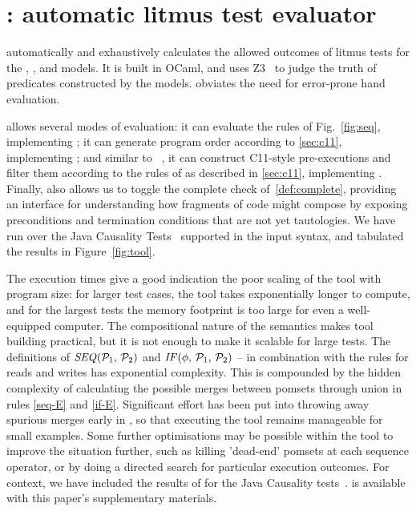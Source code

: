 \section{\PwTerTITLE: automatic litmus test evaluator}
\label{sec:tool}

\PwTer{} automatically and exhaustively calculates the allowed outcomes of litmus tests for the \PwT, \PwTpo, and \PwTc{} models. It is built in OCaml, and uses Z3~\cite{Z3Solver} to judge the truth of predicates constructed by the models. \PwTer{} obviates the need for error-prone hand evaluation.

\PwTer{} allows several modes of evaluation: it can evaluate the rules of Fig.~\ref{fig:seq}, implementing \PwT; it can generate program order according to \textsection\ref{sec:c11}, implementing \PwTpo; and similar to \MRD~\cite{DBLP:conf/esop/PaviottiCPWOB20}, it can construct C11-style pre-executions and filter them according to the rules of \rcXI{} as described in \textsection\ref{sec:c11}, implementing \PwTc{}.
Finally, \PwTer{} also allows us to toggle the complete check of~\ref{def:complete}, providing an interface for understanding how fragments of code might compose by exposing preconditions and termination conditions that are not yet tautologies.
We have run \PwTer{} over the Java Causality Tests~\cite{PughWebsite} supported in the input syntax, and tabulated the results in Figure~\ref{fig:tool}.

The execution times give a good indication the poor scaling of the tool with program size: for larger test cases, the tool takes exponentially longer to compute, and for the largest tests the memory footprint is too large for even a well-equipped computer.
The compositional nature of the semantics makes tool building practical, but it is not enough to make it scalable for large tests.
The definitions of $\sSEMI{\aPSS_1}{\aPSS_2}$ and $\sIF{\aForm}\sTHEN\aPSS_1\sELSE\aPSS_2\sFI$ -- in combination with the rules for reads and writes has exponential complexity.
This is compounded by the hidden complexity of calculating the possible merges between pomsets through union in rules \ref{seq-E} and \ref{if-E}.
Significant effort has been put into throwing away spurious merges early in \PwTer, so that executing the tool remains manageable for small examples.
Some further optimisations may be possible within the tool to improve the situation further, such as killing 'dead-end' pomsets at each sequence operator, or by doing a directed search for particular execution outcomes.
For context, we have included the results of \MRD{} for the Java Causality tests~\cite{DBLP:conf/esop/PaviottiCPWOB20}.
\PwTer{} is available with this paper's supplementary materials.

